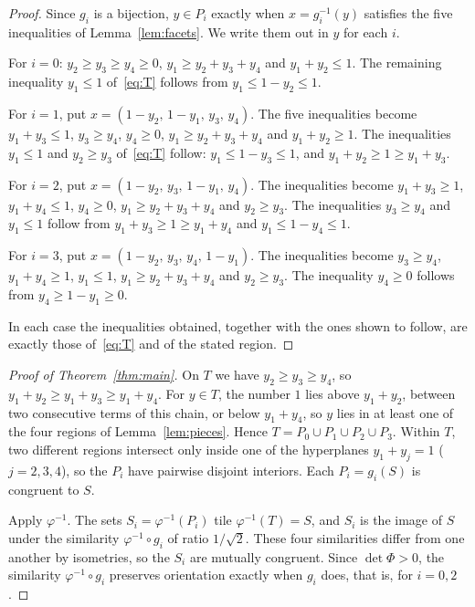 \documentclass[11pt]{article}
\theoremstyle{remark}
\begin{document}
\begin{proof}
Since $g_i$ is a bijection, $y\in P_i$ exactly when $x=g_i^{-1}(y)$
satisfies the five inequalities of Lemma~\ref{lem:facets}. We write them
out in $y$ for each $i$.

For $i=0$: $y_2\ge y_3\ge y_4\ge0$, $y_1\ge y_2+y_3+y_4$ and
$y_1+y_2\le1$. The remaining inequality $y_1\le1$ of~\eqref{eq:T}
follows from $y_1\le1-y_2\le1$.

For $i=1$, put $x=(1-y_2,\,1-y_1,\,y_3,\,y_4)$. The five inequalities
become $y_1+y_3\le1$, $y_3\ge y_4$, $y_4\ge0$, $y_1\ge y_2+y_3+y_4$ and
$y_1+y_2\ge1$. The inequalities $y_1\le1$ and $y_2\ge y_3$ of~\eqref{eq:T}
follow: $y_1\le1-y_3\le1$, and $y_1+y_2\ge1\ge y_1+y_3$.

For $i=2$, put $x=(1-y_2,\,y_3,\,1-y_1,\,y_4)$. The inequalities become
$y_1+y_3\ge1$, $y_1+y_4\le1$, $y_4\ge0$, $y_1\ge y_2+y_3+y_4$ and
$y_2\ge y_3$. The inequalities $y_3\ge y_4$ and $y_1\le1$ follow from
$y_1+y_3\ge1\ge y_1+y_4$ and $y_1\le1-y_4\le1$.

For $i=3$, put $x=(1-y_2,\,y_3,\,y_4,\,1-y_1)$. The inequalities become
$y_3\ge y_4$, $y_1+y_4\ge1$, $y_1\le1$, $y_1\ge y_2+y_3+y_4$ and
$y_2\ge y_3$. The inequality $y_4\ge0$ follows from $y_4\ge1-y_1\ge0$.

In each case the inequalities obtained, together with the ones shown to
follow, are exactly those of~\eqref{eq:T} and of the stated region.
\end{proof}

\begin{proof}[Proof of Theorem~\ref{thm:main}]
On $T$ we have $y_2\ge y_3\ge y_4$, so $y_1+y_2\ge y_1+y_3\ge y_1+y_4$.
For $y\in T$, the number $1$ lies above $y_1+y_2$, between two consecutive
terms of this chain, or below $y_1+y_4$, so $y$ lies in at least one of
the four regions of Lemma~\ref{lem:pieces}. Hence
$T=P_0\cup P_1\cup P_2\cup P_3$. Within $T$, two different regions intersect only
inside one of the hyperplanes $y_1+y_j=1$ ($j=2,3,4$), so the $P_i$ have
pairwise disjoint interiors. Each $P_i=g_i(S)$ is congruent to $S$.

Apply $\varphi^{-1}$. The sets $S_i=\varphi^{-1}(P_i)$ tile
$\varphi^{-1}(T)=S$, and $S_i$ is the image of $S$ under the similarity
$\varphi^{-1}\circ g_i$ of ratio $1/\sqrt2$. These four similarities
differ from one another by isometries, so the $S_i$ are mutually
congruent. Since $\det\Phi>0$, the similarity $\varphi^{-1}\circ g_i$
preserves orientation exactly when $g_i$ does, that is, for $i=0,2$.
\end{proof}
\end{document}

